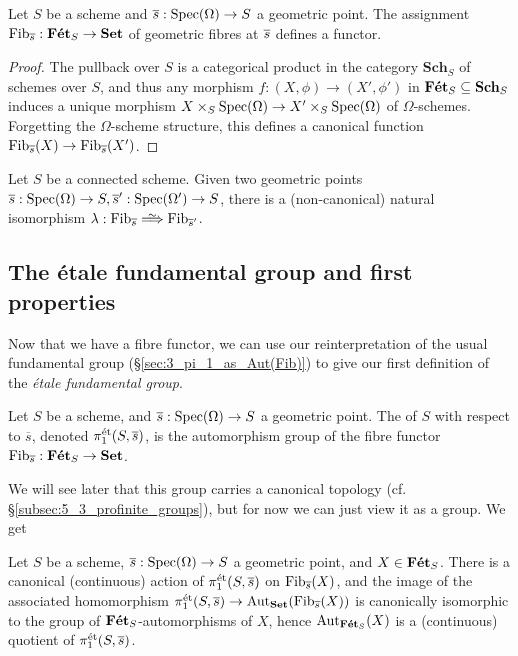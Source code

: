 \begin{prop}
	Let $S$ be a scheme and $\overline{s} : \mathrm{Spec}(\Omega) \to S$ a geometric point. The assignment $\mathrm{Fib}_{\overline{s}} : \mathbf{F\acute{e}t}_S \to \mathbf{Set}$ of geometric fibres at $\overline{s}$ defines a functor.
\end{prop}
\begin{proof}
	The pullback over $S$ is a categorical product in the category $\mathbf{Sch}_S$ of schemes over $S$, and thus any morphism $f:(X,\phi) \to (X', \phi')$ in $\mathbf{F\acute{e}t}_S \subseteq \mathbf{Sch}_S$ induces a unique morphism $X \times_S \mathrm{Spec}(\Omega) \to X' \times_S \mathrm{Spec}(\Omega)$ of $\Omega$-schemes. Forgetting the $\Omega$-scheme structure, this defines a canonical function $\mathrm{Fib}_{\overline{s}}(X) \to \mathrm{Fib}_{\overline{s}}(X')$.
\end{proof}


\begin{prop}
	\label{prop:isomorphic_fibre_functors}
	Let $S$ be a connected scheme. Given two geometric points $\overline{s} : \mathrm{Spec}(\Omega) \to S, \overline{s}' : \mathrm{Spec}(\Omega') \to S$, there is a (non-canonical) natural isomorphism $\lambda : \Fib_{\ol{s}} \ISO \Fib_{\ol{s}'}$.
\end{prop}

\subsection{The \'etale fundamental group and first properties}
\label{subsec:4_2_efg}
Now that we have a fibre functor, we can use our reinterpretation of the usual fundamental group (\S\ref{sec:3_pi_1_as_Aut(Fib)}) to give our first definition of the \emph{\'etale fundamental group}.

\begin{defn}
	Let $S$ be a scheme, and $\overline{s} : \mathrm{Spec}(\Omega) \to S$ a geometric point. The  of $S$ with respect to $\overline{s}$, denoted $\pi_1^{\mathrm{\acute{e}t}}(S, \overline{s})$, is the automorphism group of the fibre functor $\mathrm{Fib}_{\overline{s}} : \mathbf{F\acute{e}t}_S \to \mathbf{Set}$.
\end{defn}

We will see later that this group carries a canonical topology (cf. \S\ref{subsec:5_3_profinite_groups}), but for now we can just view it as a group. We get 

\begin{prop}
	\label{prop:etale_monodromy_action}
	Let $S$ be a scheme, $\overline{s} : \mathrm{Spec}(\Omega) \to S$ a geometric point, and $X \in \mathbf{F\acute{e}t}_S$. There is a canonical (continuous) action of $\pi_1^{\mathrm{\acute{e}t}}(S,\overline{s})$ on $\mathrm{Fib}_{\overline{s}}(X)$, and the image of the associated homomorphism $\pi_1^{\mathrm{\acute{e}t}}(S, \overline{s}) \to \mathrm{Aut}_{\mathbf{Set}}(\mathrm{Fib}_{\overline{s}}(X))$ is canonically isomorphic to the group of $\mathbf{F\acute{e}t}_S$-automorphisms of $X$, hence $\mathrm{Aut}_{\mathbf{F\acute{e}t}_S}(X)$ is a (continuous) quotient of $\pi_1^{\mathrm{\acute{e}t}}(S, \overline{s})$.
\end{prop}

